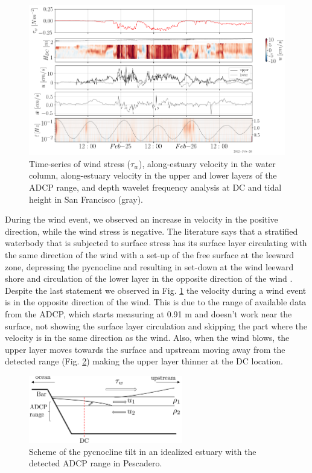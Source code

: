 \documentclass[tesis.tex]{subfiles}
\begin{document}
\begin{figure}[h!]
    \centering
    \includegraphics[width=\textwidth]{Imagenes/vel_wind.png}
    \caption{Time-series of wind stress ($\tau_w$), along-estuary velocity in the water column, along-estuary velocity in the upper and lower layers of the ADCP range, and depth wavelet frequency analysis at DC and tidal height in San Francisco (gray). }
    \label{fig:velwind}
\end{figure}

During the wind event, we observed an increase in velocity in the positive direction, while the wind stress is negative. The literature says that a stratified waterbody that is subjected to surface stress has its surface layer circulating with the same direction of the wind with a set-up of the free surface at the leeward zone, depressing the pycnocline and resulting in set-down at the wind leeward shore and circulation of the lower layer in the opposite direction of the wind \citep{Katopodes2018}. Despite the last statement we observed in Fig. \ref{fig:velwind} the velocity during a wind event is in the opposite direction of the wind. This is due to the range of available data from the ADCP, which starts measuring at 0.91 m and doesn't work near the surface, not showing the surface layer circulation and skipping the part where the velocity is in the same direction as the wind. Also, when the wind blows, the upper layer moves towards the surface and upstream moving away from the detected range (Fig. \ref{fig:adcp}) making the upper layer thinner at the DC location.\\

\begin{figure}[h!]
    \centering
    \includegraphics[width=0.6\textwidth]{Imagenes/ADCP_range.png}
    \caption{Scheme of the pycnocline tilt in an idealized estuary with the detected ADCP range in Pescadero.}
    \label{fig:adcp}
\end{figure}
\end{document}
